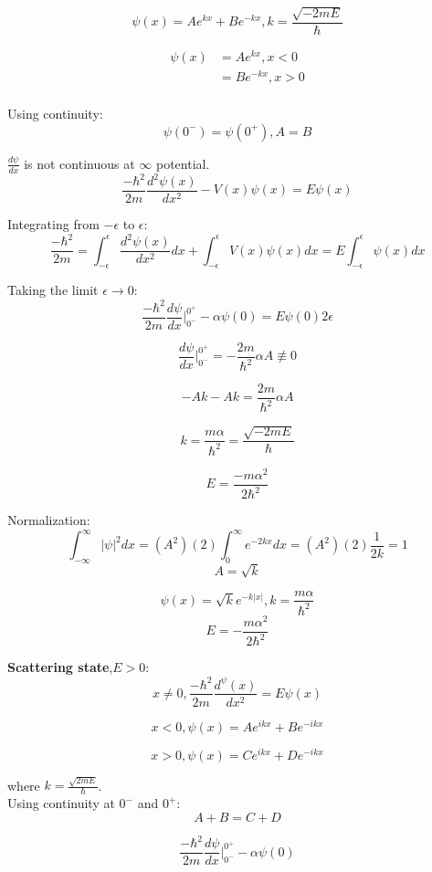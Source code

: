 \documentclass[12pt,a4paper]{article}
\begin{document}
\[
\psi (x) = A e^{kx} + Be^{-kx}, k= \frac{\sqrt{-2mE}}{\hbar}
\]

\begin{align}
\psi(x) &= Ae^{kx},  x<0 \\
        &= Be^{-kx}, x>0 \\
\end{align}

Using continuity:
\[
\psi(0^-)= \psi(0^+), A=B
\]

$ \frac{d \psi}{dx}$ is not continuous at $\infty$ potential. 
\\

\[
\frac{-\hbar ^2}{2m} \frac{d^2 \psi (x)}{dx^2} - V(x)\psi(x)= E \psi (x)
\]

Integrating from $-\epsilon$ to $\epsilon$:\\
\[
\frac{-\hbar ^2}{2m}= \int _{-\epsilon} ^{\epsilon} \frac{d^2 \psi (x)}{dx^2} dx + \int _{-\epsilon} ^{\epsilon} V(x) \psi (x) dx = E \int _{-\epsilon} ^{\epsilon} \psi (x) dx
\]

Taking the limit $\epsilon \to 0$:\\
\[
\frac{-\hbar ^2}{2m} \frac{d\psi}{dx} \Bigr | _{0 ^-} ^{0 ^+} - \alpha \psi(0)= E \psi(0) 2\epsilon
\]

\[
\frac{d\psi}{dx} \Bigr | _{0 ^-} ^{0 ^+}= - \frac{2m}{\hbar ^2} \alpha A \not \equiv 0
\]

\[
-Ak -Ak=\frac{2m}{\hbar ^2} \alpha A 
\]

\[
k=\frac{m\alpha}{\hbar ^2}=\frac{\sqrt{-2mE}}{\hbar}
\]

\[
E=\frac{-m\alpha ^2}{2\hbar ^2}
\]

Normalization:
\[
\int _{-\infty}^{\infty} |\psi|^2 dx= (A^2) (2) \int _0^{\infty} e^{-2kx}dx=(A^2) (2) \frac{1}{2k}=1
\]
\[
A=\sqrt{k}
\]

\[
\psi(x)=\sqrt{k} e^{-k|x|}, k=\frac{m\alpha}{\hbar ^2}
\]
\[
E=-\frac{m\alpha ^2}{2\hbar ^2}
\]

\textbf{Scattering state},$E>0$:
\[
x \neq 0, \frac{-\hbar ^2}{2m} \frac{d^\psi(x)}{dx^2}= E\psi(x)
\]

\[
x<0, \psi(x)= Ae^{ikx}+Be^{-ikx}
\]

\[
x>0, \psi(x)= Ce^{ikx}+De^{-ikx}
\]

where $k=\frac{\sqrt{2mE}}{\hbar}$.\\

Using continuity at $0^-$ and $0^+$:
\[
A+B=C+D
\]

\[
\frac{-\hbar ^2}{2m} \frac{d\psi}{dx} \Bigr | _{0 ^-} ^{0 ^+} - \alpha \psi(0)
\]
\end{document}
